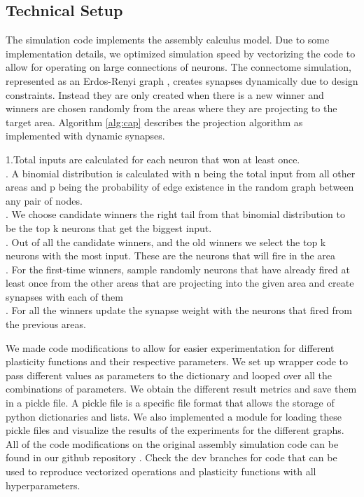 \documentclass{article}
\begin{document}
\subsection{Technical Setup}
The simulation code implements the assembly calculus model. Due to some implementation details, we optimized simulation speed by vectorizing the code to allow for operating on large connections of neurons. The connectome simulation, represented as an Erdos-Renyi graph \cite{Erdos:1960}, creates synapses dynamically due to design constraints. Instead they are only created when there is a new winner and winners are chosen randomly from the areas where they are projecting to the target area.
Algorithm \ref{alg:cap} describes the projection algorithm as implemented with dynamic synapses. 
\\
\begin{algorithm}
\caption{High-level description of assembly projection}\label{alg:cap}
\begin{algorithmic}[H]
    \State 1.Total inputs are calculated for each neuron that won at least once. \\
    . A binomial distribution is calculated with n being the total input from all other areas and p
    \State being the probability of edge existence in the random graph between any pair of nodes. \\
    . We choose candidate winners the right tail from that binomial distribution to be the top k
    \State neurons that get the biggest input.\\
    . Out of all the candidate winners, and the old winners we select the top k neurons with
    \State the most input. These are the neurons that will fire in the area\\
    . For the first-time winners, sample randomly neurons that have already fired at least once
    \State from the other areas that are projecting into the given area and create synapses with each of
    \State them\\
    . For all the winners update the synapse weight with the neurons that fired from the previous
    \State areas. 
\EndFor
\end{algorithmic}
\end{algorithm}

We made code modifications to allow for easier experimentation for different plasticity functions and their respective parameters. We set up wrapper code to pass different values as parameters to the dictionary and looped over all the combinations of parameters. We obtain the different result metrics and save them in a pickle file. A pickle file is a specific file format that allows the storage of python dictionaries and lists. We also implemented a module for loading these pickle files and visualize the results of the experiments for the different graphs. All of the code modifications on the original assembly simulation code can be found in our github repository \cite{modified_assembly_calculus}. Check the dev branches for code that can be used to reproduce vectorized operations and plasticity functions with all hyperparameters.
\\
\end{document}
